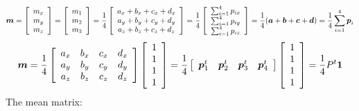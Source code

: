 \documentclass{article}
\begin{document}
\[
 \mbox{\boldmath$m$} =
\left[\begin{array}{c}
 m_x \\
 m_y \\
 m_z
\end{array}\right]
=
\left[\begin{array}{c}
 m_1 \\
 m_2 \\
 m_3
\end{array}\right]
=
\frac{1}{4}
\left[\begin{array}{c}
 a_x + b_x + c_x + d_x \\
 a_y + b_y + c_y + d_y \\
 a_z + b_z + c_z + d_z
\end{array}\right]
=
\frac{1}{4}
\left[\begin{array}{c}
 \sum_{i=1}^{4}p_{ix} \\
 \sum_{i=1}^{4}p_{iy} \\
 \sum_{i=1}^{4}p_{iz}
\end{array}\right]
=
\frac{1}{4}(\mbox{\boldmath$a$} + \mbox{\boldmath$b$} + \mbox{\boldmath$c$} +
 \mbox{\boldmath$d$})
=
\frac{1}{4}\sum_{i=1}^{4}\mbox{\boldmath$p$}_i
\]
\[
 \mbox{\boldmath$m$} =
\frac{1}{4}
\left[\begin{array}{cccc}
 a_x & b_x & c_x & d_x \\
 a_y & b_y & c_y & d_y \\
 a_z & b_z & c_z & d_z
\end{array}\right]
\left[\begin{array}{c}
 1 \\
 1 \\
 1 \\
 1
\end{array}\right]
=
\frac{1}{4}
\left[\begin{array}{cccc}
 \mbox{\boldmath$p$}_1^t & \mbox{\boldmath$p$}_2^t &
 \mbox{\boldmath$p$}_3^t & \mbox{\boldmath$p$}_4^t
\end{array}\right]
\left[\begin{array}{c}
 1 \\
 1 \\
 1 \\
 1
\end{array}\right]
=
\frac{1}{4} P^t \mbox{\boldmath$ 1$}
\]
The mean matrix:
\end{document}
